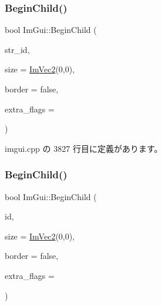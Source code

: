 \mbox{\label{namespace_im_gui_a93b10a516e6da427b743906ad97d7f16}} 
\subsubsection{\texorpdfstring{Begin\+Child()}{BeginChild()}\hspace{0.1cm}{\footnotesize\ttfamily [1/2]}}
{\footnotesize\ttfamily bool Im\+Gui\+::\+Begin\+Child (\begin{DoxyParamCaption}\item[{const char $\ast$}]{str\+\_\+id,  }\item[{const \mbox{\hyperlink{struct_im_vec2}{Im\+Vec2}} \&}]{size = {\ttfamily \mbox{\hyperlink{struct_im_vec2}{Im\+Vec2}}(0,0)},  }\item[{bool}]{border = {\ttfamily false},  }\item[{\mbox{\hyperlink{imgui_8h_a0b8e067ab4f7a818828c8d89e531addc}{Im\+Gui\+Window\+Flags}}}]{extra\+\_\+flags = {} }\end{DoxyParamCaption})}



 imgui.\+cpp の 3827 行目に定義があります。

\mbox{\label{namespace_im_gui_a3320a3f36d9d8b227f93a015792379d3}} 
\subsubsection{\texorpdfstring{Begin\+Child()}{BeginChild()}\hspace{0.1cm}{\footnotesize\ttfamily [2/2]}}
{\footnotesize\ttfamily bool Im\+Gui\+::\+Begin\+Child (\begin{DoxyParamCaption}\item[{\mbox{\hyperlink{imgui_8h_a1785c9b6f4e16406764a85f32582236f}{Im\+Gui\+ID}}}]{id,  }\item[{const \mbox{\hyperlink{struct_im_vec2}{Im\+Vec2}} \&}]{size = {\ttfamily \mbox{\hyperlink{struct_im_vec2}{Im\+Vec2}}(0,0)},  }\item[{bool}]{border = {\ttfamily false},  }\item[{\mbox{\hyperlink{imgui_8h_a0b8e067ab4f7a818828c8d89e531addc}{Im\+Gui\+Window\+Flags}}}]{extra\+\_\+flags = {} }\end{DoxyParamCaption})}



